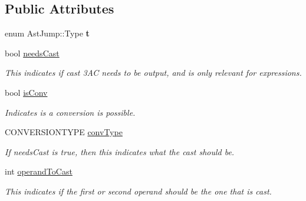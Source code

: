 \subsection*{Public Attributes}
\begin{DoxyCompactItemize}
\item 
\hypertarget{classAstJump_a1acc052020f328a4066a8f09c580aa8d}{enum Ast\-Jump\-::\-Type {\bfseries t}}\label{classAstJump_a1acc052020f328a4066a8f09c580aa8d}

\item 
\hypertarget{classAST_aaf215802de409f8096c063d01ffa6783}{bool \hyperlink{classAST_aaf215802de409f8096c063d01ffa6783}{needs\-Cast}}\label{classAST_aaf215802de409f8096c063d01ffa6783}

\begin{DoxyCompactList}\small\item\em This indicates if cast 3\-A\-C needs to be output, and is only relevant for expressions. \end{DoxyCompactList}\item 
\hypertarget{classAST_afa9e77ef650ec6664458fa6cb55be985}{bool \hyperlink{classAST_afa9e77ef650ec6664458fa6cb55be985}{is\-Conv}}\label{classAST_afa9e77ef650ec6664458fa6cb55be985}

\begin{DoxyCompactList}\small\item\em Indicates is a conversion is possible. \end{DoxyCompactList}\item 
\hypertarget{classAST_a61ef3317e023d45237e06615b387cd6b}{C\-O\-N\-V\-E\-R\-S\-I\-O\-N\-T\-Y\-P\-E \hyperlink{classAST_a61ef3317e023d45237e06615b387cd6b}{conv\-Type}}\label{classAST_a61ef3317e023d45237e06615b387cd6b}

\begin{DoxyCompactList}\small\item\em If needs\-Cast is true, then this indicates what the cast should be. \end{DoxyCompactList}\item 
\hypertarget{classAST_aea9b07b39d24183f38c0029cec0a878e}{int \hyperlink{classAST_aea9b07b39d24183f38c0029cec0a878e}{operand\-To\-Cast}}\label{classAST_aea9b07b39d24183f38c0029cec0a878e}

\begin{DoxyCompactList}\small\item\em This indicates if the first or second operand should be the one that is cast. \end{DoxyCompactList}\end{DoxyCompactItemize}
